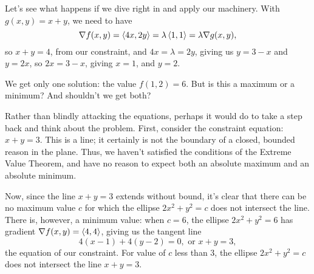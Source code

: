 {
Let's see what happens if we dive right in and apply our machinery. With $g(x,y)=x+y$, we need to have
\[
\nabla f(x,y) = \left\langle 4x, 2y\right\rangle = \lambda\left\langle 1,1\right\rangle = \lambda\nabla g(x,y),
\]
so $x+y=4$, from our constraint, and $4x=\lambda=2y$, giving us $y=3-x$ and $y=2x$, so $2x=3-x$, giving $x=1$, and $y=2$.

We get only one solution: the value $f(1,2)=6$. But is this a maximum or a minimum? And shouldn't we get both?

Rather than blindly attacking the equations, perhaps it would do to take a step back and think about the problem. First, consider the constraint equation: $x+y=3$. This is a line; it certainly is not the boundary of a closed, bounded reason in the plane. Thus, we haven't satisfied the conditions of the Extreme Value Theorem, and have no reason to expect both an absolute maximum and an absolute minimum.

Now, since the line $x+y=3$ extends without bound, it's clear that there can be no maximum value $c$ for which the ellipse $2x^2+y^2=c$ does not intersect the line. There is, however, a minimum value: when $c=6$, the ellipse $2x^2+y^2=6$ has gradient $\nabla f(x,y)=\left\langle 4,4\right\rangle$, giving us the tangent line
\[
4(x-1)+4(y-2)=0, \text{ or } x+y=3,
\]
the equation of our constraint. For value of $c$ less than 3, the ellipse $2x^2+y^2=c$ does not intersect the line $x+y=3$.
}\\

